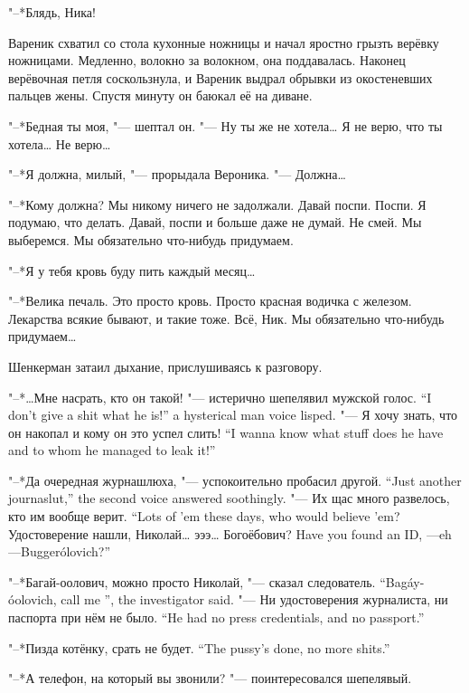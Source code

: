 "--*Блядь, Ника!

Вареник схватил со стола кухонные ножницы и начал яростно грызть верёвку ножницами.
Медленно, волокно за волокном, она поддавалась.
Наконец верёвочная петля соскользнула, и Вареник выдрал обрывки из окостеневших пальцев жены.
Спустя минуту он баюкал её на диване.

"--*Бедная ты моя, "--- шептал он.
"--- Ну ты же не хотела\ldots{}
Я не верю, что ты хотела\ldots{}
Не верю\ldots{}

"--*Я должна, милый, "--- прорыдала Вероника.
"--- Должна\ldots{}

"--*Кому должна?
Мы никому ничего не задолжали.
Давай поспи.
Поспи.
Я подумаю, что делать.
Давай, поспи и больше даже не думай.
Не смей.
Мы выберемся.
Мы обязательно что-нибудь придумаем.

"--*Я у тебя кровь буду пить каждый месяц\ldots{}

"--*Велика печаль.
Это просто кровь.
Просто красная водичка с железом.
Лекарства всякие бывают, и такие тоже.
Всё, Ник.
Мы обязательно что-нибудь придумаем\ldots{}

\asterism

Шенкерман затаил дыхание, прислушиваясь к разговору.

{"--*\ldots{}Мне насрать, кто он такой! "--- истерично шепелявил мужской голос.}
{``I don't give a shit what he is!'' a hysterical man voice lisped.}
{"--- Я хочу знать, что он накопал и кому он это успел слить!}
{``I wanna know what stuff does he have and to whom he managed to leak it!''}

{"--*Да очередная журнашлюха, "--- успокоительно пробасил другой.}
{``Just another journaslut,'' the second voice answered soothingly.}
{"--- Их щас много развелось, кто им вообще верит.}
{``Lots of 'em these days, who would believe 'em?}
{Удостоверение нашли, Николай\ldots{} эээ\ldots{} Богоёбович?}
{Have you found an ID, \Nikolay---eh---Bugger\'olovich?''}

{"--*Багай-оолович, можно просто Николай, "--- сказал следователь.}
{``Bag\'ay-\'oolovich, call me \Nikolay'', the investigator said.}
{"--- Ни удостоверения журналиста, ни паспорта при нём не было.}
{``He had no press credentials, and no passport.''}

{"--*Пизда котёнку, срать не будет.}
{``The pussy's done, no more shits.''}

"--*А телефон, на который вы звонили? "--- поинтересовался шепелявый.

